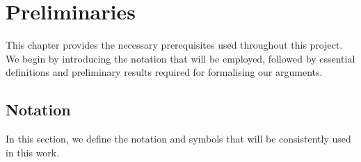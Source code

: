 



\chapter{Preliminaries}

This chapter provides the necessary prerequisites used throughout this project.
We begin by introducing the notation that will be employed, followed by essential definitions and
preliminary results required for formalising our arguments.

\section{Notation}

In this section, we define the notation and symbols that will be consistently used in this work.

